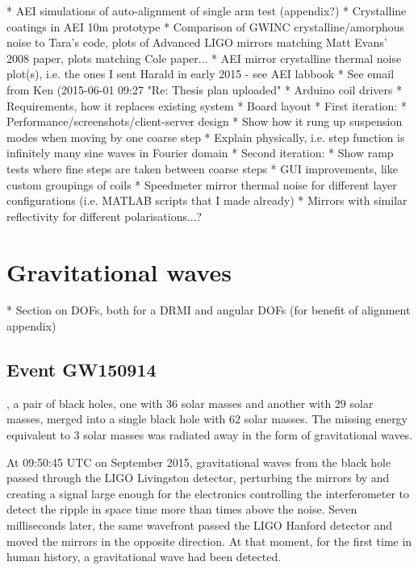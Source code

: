 * AEI simulations of auto-alignment of single arm test (appendix?)
* Crystalline coatings in AEI 10m prototype
  * Comparison of GWINC crystalline/amorphous noise to Tara's code, plots of Advanced LIGO mirrors matching Matt Evans' 2008 paper, plots matching Cole paper...
  * AEI mirror crystalline thermal noise plot(s), i.e. the ones I sent Harald in early 2015 - see AEI labbook
  * See email from Ken (2015-06-01 09:27 "Re: Thesis plan uploaded"
* Arduino coil drivers
  * Requirements, how it replaces existing system
  * Board layout
  * First iteration:
    * Performance/screenshots/client-server design
    * Show how it rung up suspension modes when moving by one coarse step
      * Explain physically, i.e. step function is infinitely many sine waves in Fourier domain
  * Second iteration:
    * Show ramp tests where fine steps are taken between coarse steps
    * GUI improvements, like custom groupings of coils
* Speedmeter mirror thermal noise for different layer configurations (i.e. MATLAB scripts that I made already)
* Mirrors with similar reflectivity for different polarisations...?

\chapter{Gravitational waves}
\label{c:gw-detection}

* Section on DOFs, both for a DRMI and angular DOFs (for benefit of alignment appendix)

\section{Event GW150914}
, a pair of black holes, one with 36 solar masses and another with 29 solar masses, merged into a single black hole with 62 solar masses. The missing energy equivalent to 3 solar masses was radiated away in the form of gravitational waves.

At 09:50:45 \gls{UTC} on  September 2015, gravitational waves from the black hole passed through the LIGO Livingston detector, perturbing the mirrors by  and creating a signal large enough for the electronics controlling the interferometer to detect the ripple in space time more than  times above the noise. Seven milliseconds later, the same wavefront passed the LIGO Hanford detector and moved the mirrors in the opposite direction. At that moment, for the first time in human history, a gravitational wave had been detected.

